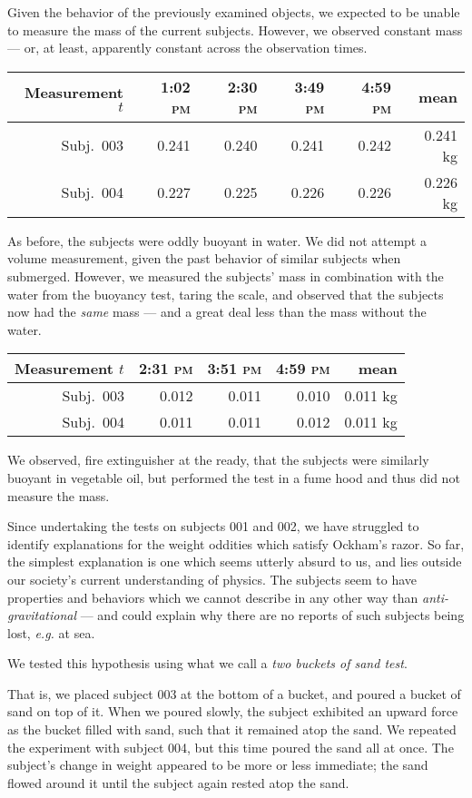 \documentclass[10pt]{article}
\begin{document}
Given the behavior of the previously examined objects, we expected to be unable to measure the mass of the current subjects.
However, we observed constant mass --- or, at least, apparently constant across the observation times.

\begin{tabular}[h]{r|rrrr|r}
Measurement $t$ & 1:02 \textsc{pm} & 2:30 \textsc{pm} & 3:49 \textsc{pm} & 4:59 \textsc{pm} & mean \\
\hline
Subj.~003 & 0.241 & 0.240 & 0.241 & 0.242 & 0.241 kg \\
Subj.~004 & 0.227 & 0.225 & 0.226 & 0.226 & 0.226 kg \\
\hline
\end{tabular}

As before, the subjects were oddly buoyant in water.
We did not attempt a volume measurement, given the past behavior of similar subjects when submerged.
However, we measured the subjects' mass in combination with the water from the buoyancy test, taring the scale, and observed that the subjects now had the \textit{same} mass --- and a great deal less than the mass without the water.

\begin{tabular}[h]{r|rrr|r}
Measurement $t$ & 2:31 \textsc{pm} & 3:51 \textsc{pm} & 4:59 \textsc{pm} & mean \\
\hline
Subj.~003 & 0.012 & 0.011 & 0.010 & 0.011 kg \\
Subj.~004 & 0.011 & 0.011 & 0.012 & 0.011 kg \\
\hline
\end{tabular}

We observed, fire extinguisher at the ready, that the subjects were similarly buoyant in vegetable oil, but performed the test in a fume hood and thus did not measure the mass.

Since undertaking the tests on subjects 001 and 002, we have struggled to identify explanations for the weight oddities which satisfy Ockham's razor.
So far, the simplest explanation is one which seems utterly absurd to us, and lies outside our society's current understanding of physics.
The subjects seem to have properties and behaviors which we cannot describe in any other way than \textit{anti-gravitational} --- and could explain why there are no reports of such subjects being lost, \textit{e.g.} at sea.

We tested this hypothesis using what we call a \textit{two buckets of sand test}.

That is, we placed subject 003 at the bottom of a bucket, and poured a bucket of sand on top of it.
When we poured slowly, the subject exhibited an upward force as the bucket filled with sand, such that it remained atop the sand.
We repeated the experiment with subject 004, but this time poured the sand all at once.
The subject's change in weight appeared to be more or less immediate; the sand flowed around it until the subject again rested atop the sand.
\end{document}
